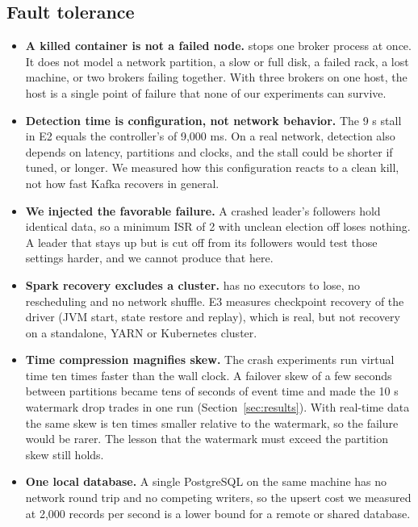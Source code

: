 \subsection{Fault tolerance}
\begin{itemize}
  \item \textbf{A killed container is not a failed node.}  stops one broker process at once.
        It does not model a network partition, a slow or full disk, a failed rack, a lost machine, or two
        brokers failing together. With three brokers on one host, the host is a single point of failure that
        none of our experiments can survive.
  \item \textbf{Detection time is configuration, not network behavior.} The 9 s stall in E2 equals the
        controller's  of 9,000 ms. On a real network, detection also depends on
        latency, partitions and clocks, and the stall could be shorter if tuned, or longer. We measured how this
        configuration reacts to a clean kill, not how fast Kafka recovers in general.
  \item \textbf{We injected the favorable failure.} A crashed leader's followers hold identical data, so a
        minimum ISR of 2 with unclean election off loses nothing. A leader that stays up but is cut off from
        its followers would test those settings harder, and we cannot produce that here.
  \item \textbf{Spark recovery excludes a cluster.}  has no executors to lose, no rescheduling and
        no network shuffle. E3 measures checkpoint recovery of the driver (JVM start, state restore and
        replay), which is real, but not recovery on a standalone, YARN or Kubernetes cluster.
  \item \textbf{Time compression magnifies skew.} The crash experiments run virtual time ten times faster than
        the wall clock. A failover skew of a few seconds between partitions became tens of seconds of event
        time and made the 10 s watermark drop trades in one run (Section~\ref{sec:results}). With real-time data
        the same skew is ten times smaller relative to the watermark, so the failure would be rarer. The
        lesson that the watermark must exceed the partition skew still holds.
  \item \textbf{One local database.} A single PostgreSQL on the same machine has no network round trip and no
        competing writers, so the upsert cost we measured at 2,000 records per second is a lower bound for a
        remote or shared database.
\end{itemize}


